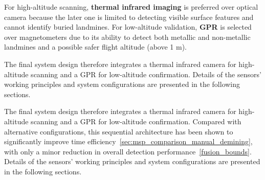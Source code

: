 For high-altitude scanning, \textbf{thermal infrared imaging} is preferred over optical camera because the later one is limited to detecting visible surface features and cannot identify buried landmines. For low-altitude validation, \textbf{\gls{GPR}} is selected over magnetometers due to its ability to detect both metallic and non-metallic landmines and a possible safer flight altitude (above 1 m).

The final system design therefore integrates a thermal infrared camera for high-altitude scanning and a \gls{GPR} for low-altitude confirmation. Details of the sensors' working principles and system configurations are presented in the following sections. 

The final system design therefore integrates a thermal infrared camera for high-altitude scanning and a \gls{GPR} for low-altitude confirmation. Compared with alternative configurations, this sequential architecture has been shown to significantly improve time efficiency~\ref{sec:msp_comparison_manual_demining}, with only a minor reduction in overall detection performance~\ref{fusion_bounds}. Details of the sensors’ working principles and system configurations are presented in the following sections.